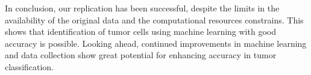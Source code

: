 \par
In conclusion, our replication has been successful, despite the limits in the availability of the original data and the computational resources constrains. This shows that identification of tumor cells using machine learning with good accuracy is possible. Looking ahead, continued improvements in machine learning and data collection show great potential for enhancing accuracy in tumor classification.